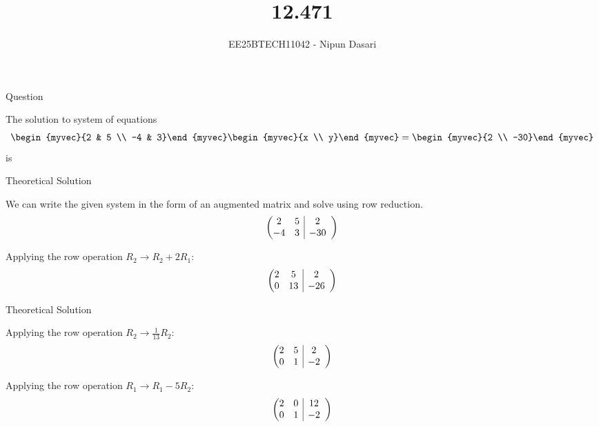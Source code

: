 \documentclass{beamer}
\title{12.471}
\author{EE25BTECH11042 - Nipun Dasari}
\makeatletter
\numberwithin{equation}{section}
\theoremstyle{remark}
\newenvironment{amatrix}[1]{%
	\left(\begin{array}{@{}*{#1}{c}|*{#1}{c}@{}}
	}{%
	\end{array}\right)
}
\newcommand{\myaugvec}[2]{\ensuremath{\begin{amatrix}{#1}#2\end{amatrix}}}
\makeatother
\begin{document}
	
	\begin{frame}
		\titlepage
	\end{frame}
	
	\begin{frame}[fragile]{Question}
		
		The solution to system of equations
		\begin{align}
			\begin{myvec}{2 & 5 \\ -4 & 3}\end{myvec}
			\begin{myvec}{x \\ y}\end{myvec}
			=
			\begin{myvec}{2 \\ -30}\end{myvec}
		\end{align}
		is
		
	\end{frame}
	
	\begin{frame}{Theoretical Solution}
		
		We can write the given system in the form of an augmented matrix and solve using row reduction.
		\begin{align}
			\myaugvec{2}{2 & 5 & 2 \\ -4 & 3 & -30}
		\end{align}
		
		Applying the row operation $R_2 \to R_2 + 2R_1$:
		\begin{align}
			\myaugvec{2}{2 & 5 & 2 \\ 0 & 13 & -26}
		\end{align}
		
	\end{frame}
	
	\begin{frame}{Theoretical Solution}
		
		Applying the row operation $R_2 \to \frac{1}{13}R_2$:
		\begin{align}
			\myaugvec{2}{2 & 5 & 2 \\ 0 & 1 & -2}
		\end{align}
		
		Applying the row operation $R_1 \to R_1 - 5R_2$:
		\begin{align}
			\myaugvec{2}{2 & 0 & 12 \\ 0 & 1 & -2}
		\end{align}
		
	\end{frame}
	
\end{document}
